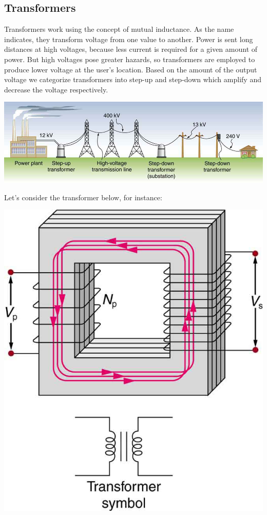 \documentclass[11pt]{article}
\begin{document}
	\subsection*{Transformers}
	Transformers work using the concept of mutual inductance. As the name indicates, they transform voltage from one value to another. Power is sent long distances at high voltages, because less current is required for a given amount of
	power. But high voltages pose greater hazards, so transformers are employed to produce lower voltage at the user’s location. Based on the amount of the output voltage we categorize transformers into step-up and step-down which amplify and decrease the voltage respectively.
	\begin{center}
		\includegraphics[scale=0.5]{transformers}
	\end{center}
	Let's consider the transformer below, for instance:
	\begin{center}
		\includegraphics[scale=0.35]{transformer}
	\end{center}
\end{document}
